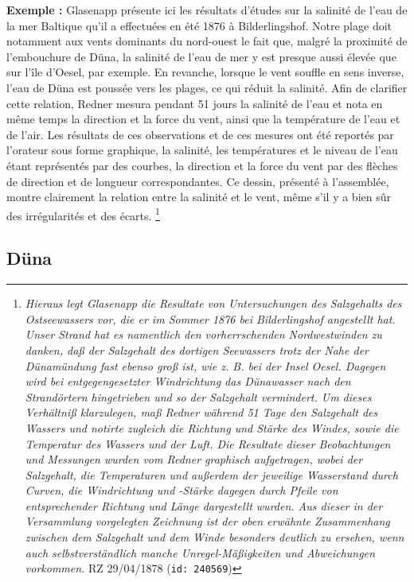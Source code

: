 \documentclass[a4paper,twoside,12pt]{article}
\begin{document}
\noindent \textbf{Exemple :} \og Glasenapp présente ici les résultats d'études sur la salinité de l'eau de la mer Baltique qu'il a effectuées en été 1876 à Bilderlingshof. Notre plage doit notamment aux vents dominants du nord-ouest le fait que, malgré la proximité de l'embouchure de Düna, la salinité de l'eau de mer y est presque aussi élevée que sur l'île d'Oesel, par exemple. En revanche, lorsque le vent souffle en sens inverse, l'eau de Düna est poussée vers les plages, ce qui réduit la salinité. Afin de clarifier cette relation, Redner mesura pendant 51 jours la salinité de l'eau et nota en même temps la direction et la force du vent, ainsi que la température de l'eau et de l'air. Les résultats de ces observations et de ces mesures ont été reportés par l'orateur sous forme graphique, la salinité, les températures et le niveau de l'eau étant représentés par des courbes, la direction et la force du vent par des flèches de direction et de longueur correspondantes.
Ce dessin, présenté à l'assemblée, montre clairement la relation entre la salinité et le vent, même s'il y a bien sûr des irrégularités et des écarts. \fg{}\footnote{\textit{Hieraus legt Glasenapp die Resultate von Untersuchungen des Salzgehalts des Ostseewassers vor, die er im Sommer 1876 bei Bilderlingshof angestellt hat.
Unser Strand hat es namentlich den vorherrschenden Nordwestwinden zu danken, daß der Salzgehalt des dortigen Seewassers trotz der Nahe der Dünamündung fast ebenso groß ist, wie z. B. bei der Insel Oesel. Dagegen wird bei entgegengesetzter Windrichtung das Dünawasser nach den Strandörtern hingetrieben und so der Salzgehalt vermindert. Um dieses Verhältniß klarzulegen, maß Redner während 51 Tage den Salzgehalt des Wassers und notirte zugleich die Richtung und Stärke des Windes, sowie die Temperatur des Wassers und der Luft. Die Resultate dieser Beobachtungen und Messungen wurden vom Redner graphisch aufgetragen, wobei der Salzgehalt, die Temperaturen und außerdem der jeweilige Wasserstand durch Curven, die Windrichtung und -Stärke dagegen durch Pfeile von entsprechender Richtung und Länge dargestellt wurden.
Aus dieser in der Versammlung vorgelegten Zeichnung ist der oben erwähnte Zusammenhang zwischen dem Salzgehalt und dem Winde besonders deutlich zu ersehen, wenn auch selbstverständlich manche Unregel-Mäßigkeiten und Abweichungen vorkommen.} RZ 29/04/1878 (\texttt{id: 240569})}



\subsection*{Düna} \label{topic14_düna}
\end{document}
